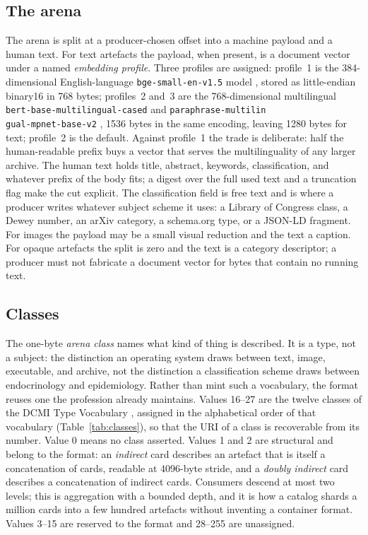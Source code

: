 \documentclass[sigconf]{acmart}
\begin{document}
\subsection{The arena}

The arena is split at a producer-chosen offset into a machine payload and a
human text. For text artefacts the payload, when present, is a document vector
under a named \emph{embedding profile}. Three profiles are assigned:
profile~1 is the 384-dimensional English-language \texttt{bge-small-en-v1.5}
model \cite{Xiao:2023}, stored as little-endian binary16 in 768 bytes;
profiles~2 and~3 are the 768-dimensional multilingual
\texttt{bert-base-multilingual-cased} \cite{Devlin:2019} and
\texttt{paraphrase-multilin}\\\texttt{gual-mpnet-base-v2} \cite{Reimers:2020}, 1536
bytes in the same encoding, leaving 1280 bytes for text; profile~2 is the
default. Against profile~1 the trade is deliberate: half the human-readable
prefix buys a vector that serves the multilinguality of any larger
archive. The human
text holds title, abstract, keywords, classification, and whatever prefix of
the body fits; a digest over the full used text and a truncation flag make the
cut explicit. The classification field is free text and is where a producer
writes whatever subject scheme it uses: a Library of Congress class, a Dewey
number, an arXiv category, a schema.org type, or a JSON-LD fragment. For
images the payload may be a small visual reduction and the text a caption. For
opaque artefacts the split is zero and the text is a category descriptor; a
producer must not fabricate a document vector for bytes that contain no
running text.

\subsection{Classes}
\label{sec:classes}

The one-byte \emph{arena class} names what kind of thing is described. It is a
type, not a subject: the distinction an operating system draws between text,
image, executable, and archive, not the distinction a classification scheme
draws between endocrinology and epidemiology. Rather than mint such a
vocabulary, the format reuses one the profession already maintains.
Values 16--27 are the twelve classes of the DCMI Type Vocabulary
\cite{DCMI:2020}, assigned in the alphabetical order of that vocabulary
(Table~\ref{tab:classes}), so that the URI of a class is recoverable from its
number. Value 0 means no class asserted. Values 1 and 2 are structural and
belong to the format: an \emph{indirect} card describes an artefact that is
itself a concatenation of cards, readable at 4096-byte stride, and a
\emph{doubly indirect} card describes a concatenation of indirect cards.
Consumers descend at most two levels; this is aggregation with a bounded
depth, and it is how a catalog shards a million cards into a few hundred
artefacts without inventing a container format. Values 3--15 are reserved to
the format and 28--255 are unassigned.
\end{document}
